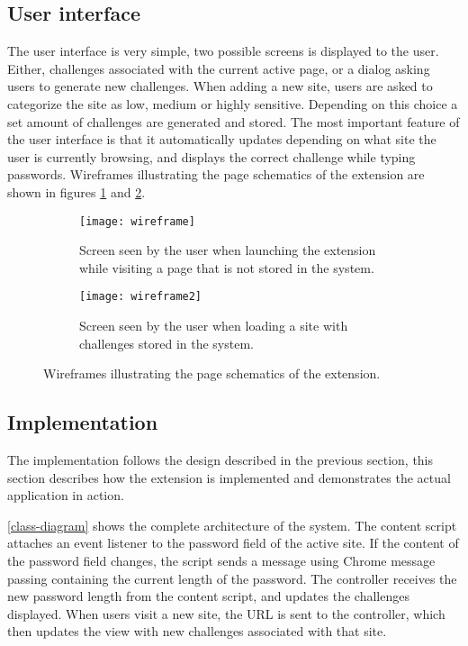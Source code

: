 \subsection{User interface}
The user interface is very simple, two possible screens is displayed to the user. Either, challenges associated with the current active page, or a dialog asking users to generate new challenges. When adding a new site, users are asked to categorize the site as low, medium or highly sensitive. Depending on this choice a set amount of challenges are generated and stored. The most important feature of the user interface is that it automatically updates depending on what site the user is currently browsing, and displays the correct challenge while typing passwords. Wireframes illustrating the page schematics of the extension are shown in figures \ref{add-new-screen} and \ref{challenge-screen}. 

\begin{figure}[ht]
    \centering
    \begin{subfigure}[t]{0.45\textwidth}
        \centering
        \texttt{[image: wireframe]} 
        \caption{Screen seen by the user when launching the extension while visiting a page that is not stored in the system.}
        \label{add-new-screen}
    \end{subfigure}
    \hfill
    \begin{subfigure}[t]{0.45\textwidth}
        \centering
        \texttt{[image: wireframe2]} 
        \caption{Screen seen by the user when loading a site with challenges stored in the system. }
        \label{challenge-screen}
    \end{subfigure}
    \caption{Wireframes illustrating the page schematics of the extension.}
    \label{wireframes}
\end{figure}

\subsection{Implementation}
The implementation follows the design described in the previous section, this section describes how the extension is implemented and demonstrates the actual application in action. 


\par \autoref{class-diagram} shows the complete architecture of the system.
 The content script attaches an event listener to the password field of the active site. If the content of the password field changes, the script sends a message using Chrome message passing containing the current length of the password. The controller receives the new password length from the content script, and updates the challenges displayed. When users visit a new site, the URL is sent to the controller, which then updates the view with new challenges associated with that site.

